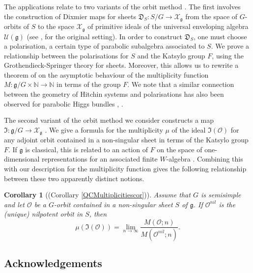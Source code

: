 \documentclass{amsart}
\newtheorem{corollary}[theorem]{Corollary}
\theoremstyle{remark}
\numberwithin{theorem}{section}
\numberwithin{equation}{section}
\begin{document}
The applications relate to two variants of the orbit method \cite{Kirillov}. The first involves the construction of Dixmier maps for sheets $\mathfrak{D}_S:S/G \rightarrow \mathscr X_\mathfrak{g}$ from the space of $G$-orbits of $S$ to the space $\mathscr X_\mathfrak{g}$ of primitive ideals of the universal enveloping algebra $\mathcal U(\mathfrak{g})$ \cite{Borho1} (see \cite{Dixmier1}, \cite{Dixmier2} for the original setting). In order to construct $\mathfrak{D}_S$, one must choose a polarisation, a certain type of parabolic subalgebra associated to $S$. We prove a relationship between the polarisations for $S$ and the Katsylo group $F$, using the Grothendieck-Springer theory for sheets. Moreover, this allows us to rewrite a theorem of \cite{BK} on the asymptotic behaviour of the multiplicity function $M:\mathfrak{g}/G \times \mathbb{N} \rightarrow \mathbb{N}$ in terms of the group $F$. We note that a similar connection between the geometry of Hitchin systems and polarisations has also been observed for parabolic Higgs bundles \cite{WWW1}, \cite{WWW2}.

The second variant of the orbit method we consider constructs a map $\mathfrak{I}:\mathfrak{g}/G \rightarrow \mathscr X_\mathfrak{g}$ \cite{Losev4}. We give a formula for the multiplicity $\mu$ of the ideal $\mathfrak{I}(\mathcal O)$ for any adjoint orbit contained in a non-singular sheet in terms of the Katsylo group $F$. If $\mathfrak{g}$ is classical, this is related to an action of $F$ on the space of one-dimensional representations for an associated finite $W$-algebra \cite{Topley}. Combining this with our description for the multiplicity function gives the following relationship between these two apparently distinct notions.

\begin{corollary}[(Corollary \ref{QCMultiplicitiescor})]\label{IntroMultiplicitiescor}
	Assume that $G$ is semisimple and let $\mathcal O$ be a $G$-orbit contained in a non-singular sheet $S$ of $\mathfrak{g}$. If $\mathcal O^{nil}$ is the (unique) nilpotent orbit in $S$, then
	\begin{equation}\label{IntroQCMultiplicitieseqn}
        		\mu(\mathfrak{I}(\mathcal O)) = \lim_{n \rightarrow\infty} \frac{M(\mathcal O;n)}{M(\mathcal O^{nil};n)}.
   	 \end{equation}
\end{corollary}

\subsection*{Acknowledgements}
\end{document}
